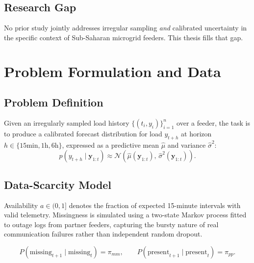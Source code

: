 \documentclass[12pt,a4paper]{report}
\begin{document}
\section{Research Gap}
No prior study jointly addresses irregular sampling \emph{and} calibrated uncertainty in the
specific context of Sub-Saharan microgrid feeders. This thesis fills that gap.

\chapter{Problem Formulation and Data}

\section{Problem Definition}
Given an irregularly sampled load history $\{(t_i, y_i)\}_{i=1}^{n}$ over a feeder, the task
is to produce a calibrated forecast distribution for load $y_{t+h}$ at horizon
$h \in \{15\text{min}, 1\text{h}, 6\text{h}\}$, expressed as a predictive mean $\hat{\mu}$ and
variance $\hat{\sigma}^2$:
\begin{equation}
\label{eq:objective}
p(y_{t+h} \mid \mathbf{y}_{1:t}) \approx \mathcal{N}\!\left(\hat{\mu}(\mathbf{y}_{1:t}),\,
\hat{\sigma}^2(\mathbf{y}_{1:t})\right).
\end{equation}

\section{Data-Scarcity Model}
Availability $a \in (0,1]$ denotes the fraction of expected 15-minute intervals with valid
telemetry. Missingness is simulated using a two-state Markov process fitted to outage logs
from partner feeders, capturing the bursty nature of real communication failures rather than
independent random dropout.

\begin{equation}
\label{eq:markov}
P(\text{missing}_{t+1} \mid \text{missing}_t) = \pi_{mm}, \qquad
P(\text{present}_{t+1} \mid \text{present}_t) = \pi_{pp}.
\end{equation}
\end{document}
